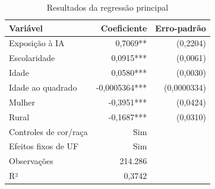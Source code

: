 \begin{table}[H]

\caption{\label{tab:regressao_principal}Resultados da regressão principal}
\centering
\begin{tabular}[t]{lrr}
\toprule
Variável & Coeficiente & Erro-padrão\\
\midrule
Exposição à IA & 0,7069** & (0,2204)\\
Escolaridade & 0,0915*** & (0,0061)\\
Idade & 0,0580*** & (0,0030)\\
Idade ao quadrado & -0,0005364*** & (0,0000334)\\
Mulher & -0,3951*** & (0,0424)\\
\addlinespace
Rural & -0,1687*** & (0,0310)\\
Controles de cor/raça & Sim & \\
Efeitos fixos de UF & Sim & \\
Observações & 214.286 & \\
R² & 0,3742 & \\
\bottomrule
\end{tabular}
\end{table}
